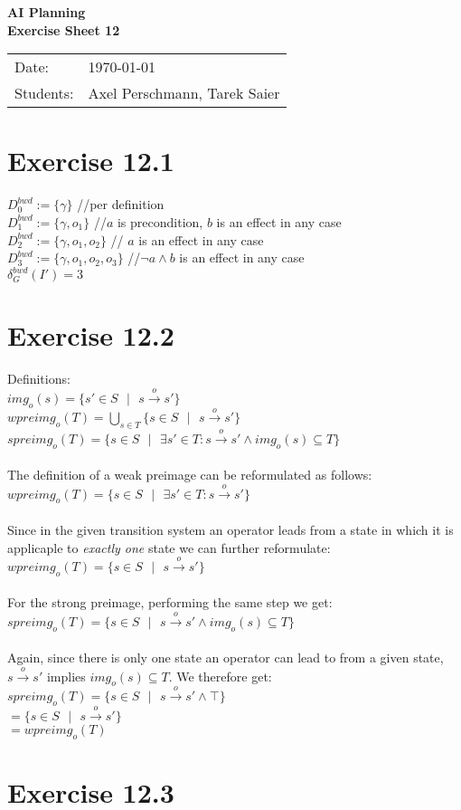 \documentclass[11pt,a4paper]{article}
\newcommand{\sheetNr}{12}
\begin{document}
\begin{center}
\Huge{\textbf{AI Planning}}\\
\LARGE{\textbf{Exercise Sheet \sheetNr}}
\end{center}
\vspace{2cm}
\begin{tabular}{ll}
Date: & \today\\
Students: & Axel Perschmann, Tarek Saier
\end{tabular}

\section*{Exercise 12.1}
$D^{bwd}_0:=\{\gamma\}$ \hphantom{tabtab} //per definition\\
$D^{bwd}_1:=\{\gamma,o_1\}$ \hphantom{tabtab} //$a$ is precondition, $b$ is an effect in any case\\
$D^{bwd}_2:=\{\gamma,o_1,o_2\}$ \hphantom{tabtab} // $a$ is an effect in any case\\
$D^{bwd}_3:=\{\gamma,o_1,o_2,o_3\}$ \hphantom{tabtab} //$\neg a\land b$ is an effect in any case\\
$\delta^{bwd}_G(I')=3$

\section*{Exercise 12.2}
Definitions:\\
$img_o(s)=\{s'\in S\text{ }|\text{ }s\stackrel{o}{\to}s'\}$\\
$wpreimg_o(T)=\bigcup_{s\in T}\{s\in S\text{ }|\text{ }s\stackrel{o}{\to}s'\}$\\
$spreimg_o(T)=\{s\in S\text{ }|\text{ }\exists s'\in T:s\stackrel{o}{\to}s'\land img_o(s)\subseteq T\}$\\
\\
The definition of a weak preimage can be reformulated as follows:\\
$wpreimg_o(T)=\{s\in S\text{ }|\text{ }\exists s'\in T:s\stackrel{o}{\to}s'\}$\\
\\
Since in the given transition system an operator leads from a state in which it is applicaple to \emph{exactly one} state we can further reformulate:\\
$wpreimg_o(T)=\{s\in S\text{ }|\text{ }s\stackrel{o}{\to}s'\}$\\
\\
For the strong preimage, performing the same step we get:\\
$spreimg_o(T)=\{s\in S\text{ }|\text{ }s\stackrel{o}{\to}s'\land img_o(s)\subseteq T\}$\\
\\
Again, since there is only one state an operator can lead to from a given state, $s\stackrel{o}{\to}s'$ implies $img_o(s)\subseteq T$. We therefore get:\\
$spreimg_o(T)=\{s\in S\text{ }|\text{ }s\stackrel{o}{\to}s'\land \top\}$\\
\hphantom{tabtabtabtab}$=\{s\in S\text{ }|\text{ }s\stackrel{o}{\to}s'\}$\\
\hphantom{tabtabtabtab}$=wpreimg_o(T)$\\

\section*{Exercise 12.3}

\label{lastpage}
\end{document}

